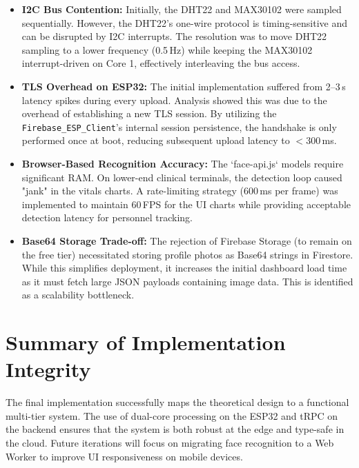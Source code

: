 \begin{itemize}
    \item \textbf{I2C Bus Contention:} Initially, the DHT22 and MAX30102 were sampled sequentially. However, the DHT22's one-wire protocol is timing-sensitive and can be disrupted by I2C interrupts. The resolution was to move DHT22 sampling to a lower frequency (0.5\,Hz) while keeping the MAX30102 interrupt-driven on Core 1, effectively interleaving the bus access.
    \item \textbf{TLS Overhead on ESP32:} The initial implementation suffered from 2--3\,s latency spikes during every upload. Analysis showed this was due to the overhead of establishing a new TLS session. By utilizing the \texttt{Firebase\_ESP\_Client}'s internal session persistence, the handshake is only performed once at boot, reducing subsequent upload latency to $<$300\,ms.
    \item \textbf{Browser-Based Recognition Accuracy:} The `face-api.js` models require significant RAM. On lower-end clinical terminals, the detection loop caused "jank" in the vitals charts. A rate-limiting strategy (600\,ms per frame) was implemented to maintain 60\,FPS for the UI charts while providing acceptable detection latency for personnel tracking.
    \item \textbf{Base64 Storage Trade-off:} The rejection of Firebase Storage (to remain on the free tier) necessitated storing profile photos as Base64 strings in Firestore. While this simplifies deployment, it increases the initial dashboard load time as it must fetch large JSON payloads containing image data. This is identified as a scalability bottleneck.
\end{itemize}

\section{Summary of Implementation Integrity}
The final implementation successfully maps the theoretical design to a functional multi-tier system. The use of dual-core processing on the ESP32 and tRPC on the backend ensures that the system is both robust at the edge and type-safe in the cloud. Future iterations will focus on migrating face recognition to a Web Worker to improve UI responsiveness on mobile devices.
